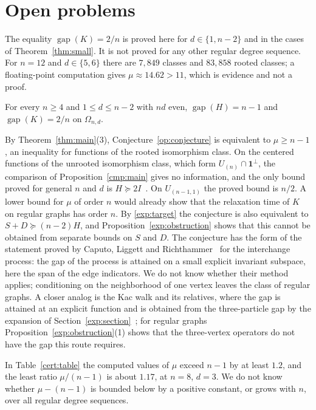 \section{Open problems}\label{op:section}
The equality $\operatorname{gap}(K)=2/n$ is proved here for $d\in\{1,n-2\}$
and in the cases of Theorem~\ref{thm:small}. It is not proved for any other
regular degree sequence. For $n=12$ and $d\in\{5,6\}$ there are $7{,}849$
classes and $83{,}858$ rooted classes; a floating-point computation gives
$\mu\approx14.62>11$, which is evidence and not a proof.

\begin{conjecture}\label{op:conjecture}
For every $n\ge4$ and $1\le d\le n-2$ with $nd$ even,
$\operatorname{gap}(H)=n-1$ and $\operatorname{gap}(K)=2/n$ on $\Omega_{n,d}$.
\end{conjecture}

By Theorem~\ref{thm:main}(3), Conjecture~\ref{op:conjecture} is equivalent to
$\mu\ge n-1$, an inequality for functions of the rooted isomorphism class. On
the centered functions of the unrooted isomorphism class, which form
$U_{(n)}\cap\mathbf1^\perp$, the comparison of Proposition~\ref{cmp:main}
gives no information, and the only bound proved for general $n$ and $d$ is
$H\succeq2I$~\cite[Theorem~1.1]{S26}. On $U_{(n-1,1)}$ the proved bound is
$n/2$. A lower bound for $\mu$ of order $n$ would already show that the
relaxation time of $K$ on regular graphs has order $n$. By
\eqref{exp:target} the conjecture is also equivalent to
$S+D\succeq(n-2)H$, and Proposition~\ref{exp:obstruction} shows that this
cannot be obtained from separate bounds on $S$ and $D$. The conjecture has the
form of the statement proved by Caputo, Liggett and
Richthammer~\cite{CLR10} for the interchange process: the gap of the process
is attained on a small explicit invariant subspace, here the span of the
edge indicators. We do not know whether their method applies; conditioning
on the neighborhood of one vertex leaves the class of regular graphs. A closer
analog is the Kac walk and its relatives, where the gap is attained at an
explicit function and is obtained from the three-particle gap by the
expansion of Section~\ref{exp:section}~\cite{Caputo08}; for regular graphs
Proposition~\ref{exp:obstruction}(1) shows that the three-vertex operators do
not have the gap this route requires.

In Table~\ref{cert:table} the computed values of $\mu$ exceed $n-1$ by at
least $1.2$, and the least ratio $\mu/(n-1)$ is about $1.17$, at $n=8$,
$d=3$. We do not know whether $\mu-(n-1)$ is bounded below by a positive
constant, or grows with $n$, over all regular degree sequences.

